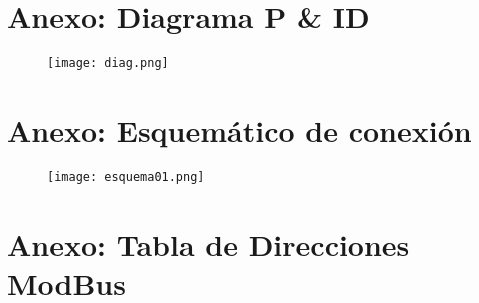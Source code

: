 
\newpage
\section{Anexo: Diagrama P \& ID} \label{anexopid}
	
	
\begin{figure}[h!]
	\centering
	\texttt{[image: diag.png]}
\end{figure}
\newpage
\section{Anexo: Esquemático de conexión} \label{anexoesquema}


\begin{figure}[h!]
	\centering
	\texttt{[image: esquema01.png]}
\end{figure}



\newpage
\section{Anexo: Tabla de Direcciones ModBus} \label{Anexo1}



